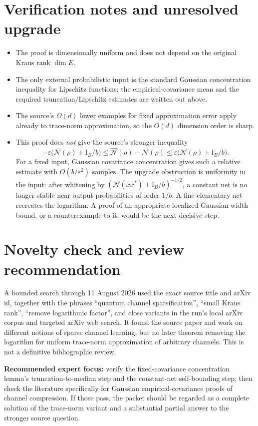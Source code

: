 \documentclass[11pt]{article}
\newcommand{\Id}{\mathrm I}
\begin{document}
\section{Verification notes and unresolved upgrade}

\begin{itemize}
\item The proof is dimensionally uniform and does not depend on the original Kraus rank $\dim E$.
\item The only external probabilistic input is the standard Gaussian concentration inequality for Lipschitz functions; the empirical-covariance mean and the required truncation/Lipschitz estimates are written out above.
\item The source's $\Omega(d)$ lower examples for fixed approximation error apply already to trace-norm approximation, so the $O(d)$ dimension order is sharp.
\item This proof does \emph{not} give the source's stronger inequality
\[
-\varepsilon\bigl(\mathcal N(\rho)+\Id_B/b\bigr)
\leq\widehat{\mathcal N}(\rho)-\mathcal N(\rho)
\leq\varepsilon\bigl(\mathcal N(\rho)+\Id_B/b\bigr).
\]
For a fixed input, Gaussian covariance concentration gives such a relative estimate with $O(b/\varepsilon^2)$ samples.  The upgrade obstruction is uniformity in the input: after whitening by $(\mathcal N(xx^*)+\Id_B/b)^{-1/2}$, a constant net is no longer stable near output probabilities of order $1/b$.  A fine elementary net recreates the logarithm.  A proof of an appropriate localized Gaussian-width bound, or a counterexample to it, would be the next decisive step.
\end{itemize}

\section{Novelty check and review recommendation}

A bounded search through 11 August 2026 used the exact source title and arXiv id, together with the phrases ``quantum channel sparsification'', ``small Kraus rank'', ``remove logarithmic factor'', and close variants in the run's local arXiv corpus and targeted arXiv web search.  It found the source paper and work on different notions of sparse channel learning, but no later theorem removing the logarithm for uniform trace-norm approximation of arbitrary channels.  This is not a definitive bibliographic review.

\textbf{Recommended expert focus:} verify the fixed-covariance concentration lemma's truncation-to-median step and the constant-net self-bounding step; then check the literature specifically for Gaussian empirical-covariance proofs of channel compression.  If those pass, the packet should be regarded as a complete solution of the trace-norm variant and a substantial partial answer to the stronger source question.
\end{document}
